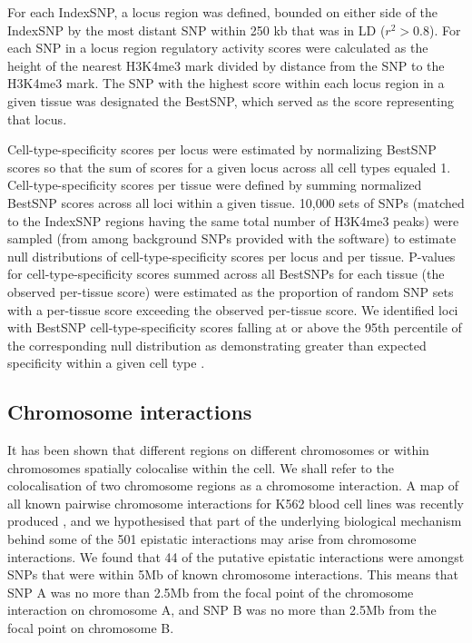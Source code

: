 \documentclass{article}
\begin{document}
For each IndexSNP, a locus region was defined, bounded on either side of the IndexSNP by the most distant SNP within 250 kb that was in LD ($r^{2} > 0.8$). For each SNP in a locus region regulatory activity scores were calculated as the height of the nearest H3K4me3 mark divided by distance from the SNP to the H3K4me3 mark. The SNP with the highest score within each locus region in a given tissue was designated the BestSNP, which served as the score representing that locus.

Cell-type-specificity scores per locus were estimated by normalizing BestSNP scores so that the sum of scores for a given locus across all cell types equaled 1. Cell-type-specificity scores per tissue were defined by summing normalized BestSNP scores across all loci within a given tissue. 10,000 sets of SNPs (matched to the IndexSNP regions having the same total number of H3K4me3 peaks) were sampled (from among background SNPs provided with the software) to estimate null distributions of cell-type-specificity scores per locus and per tissue. P-values for cell-type-specificity scores summed across all BestSNPs for each tissue (the observed per-tissue score) were estimated as the proportion of random SNP sets with a per-tissue score exceeding the observed per-tissue score. We identified loci with BestSNP cell-type-specificity scores falling at or above the 95th percentile of the corresponding null distribution as demonstrating greater than expected specificity within a given cell type \cite{Trynka2013}.


\subsection{Chromosome interactions}

It has been shown \cite{Lieberman-Aiden2009} that different regions on different chromosomes or within chromosomes spatially colocalise within the cell. We shall refer to the colocalisation of two chromosome regions as a chromosome interaction. A map of all known pairwise chromosome interactions for K562 blood cell lines was recently produced \cite{Lan2012}, and we hypothesised that part of the underlying biological mechanism behind some of the 501 epistatic interactions may arise from chromosome interactions. We found that 44 of the putative epistatic interactions were amongst SNPs that were within 5Mb of known chromosome interactions. This means that SNP A was no more than 2.5Mb from the focal point of the chromosome interaction on chromosome A, and SNP B was no more than 2.5Mb from the focal point on chromosome B.
\end{document}
